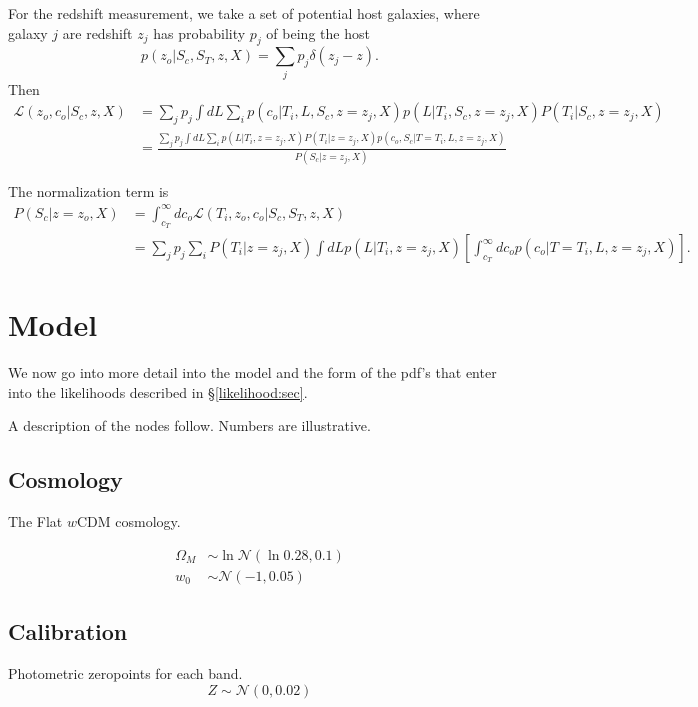 \documentclass[preprint,3p]{elsarticle}
\begin{document}
For the redshift measurement, we take a set of potential host galaxies, where galaxy $j$
are redshift $z_j$ has probability $p_j$ of being the host
\begin{equation}
p(z_o|S_c, S_T, z, X) = \sum_j p_j\delta(z_j-z).
\end{equation}
Then
\begin{align}
\mathcal{L}(z_o,c_o | S_c, z, X) & =  \sum_j p_j \int dL \sum_{i} p(c_o | T_i, L, S_c, z=z_j, X) p(L |  T_i,  S_c,  z=z_j, X) P(T_i|S_c, z=z_j, X) \\
&=  \frac{\sum_j p_j \int dL \sum_{i}  p(L|T_i, z=z_j, X) P(T_i|z=z_j, X)  p(c_o, S_c | T=T_i, L, z=z_j, X) }{P(S_c| z=z_j, X)}
\end{align}

The normalization term is
\begin{align}
P(S_c| z=z_o, X) & = \int_{c_T}^{\infty} dc_o \mathcal{L}(T_i,z_o,c_o | S_c, S_T, z, X)\\
& =  \sum_j p_j  \sum_{i} P(T_i|z=z_j, X)  \int dL  p(L|T_i, z=z_j, X) 
\left[ \int_{c_T}^\infty dc_o p(c_o| T=T_i, L, z=z_j, X) \right].
\end{align}



\section{Model}
\label{model:sec}

We now go into more detail into the model and the form of the pdf's that enter
into the likelihoods described in \S\ref{likelihood:sec}.

A description of the nodes follow.  Numbers are illustrative. 

\subsection{Cosmology}
The Flat $w$CDM cosmology.

\begin{align}
\Omega_M & \sim \ln{\mathcal{N}}(\ln{0.28},0.1)\\
w_0 & \sim \mathcal{N}(-1,0.05)
\end{align}

\subsection{Calibration}
Photometric zeropoints for each band.
\begin{equation}
Z \sim \mathcal{N}(0,0.02)
\end{equation}
\end{document}
